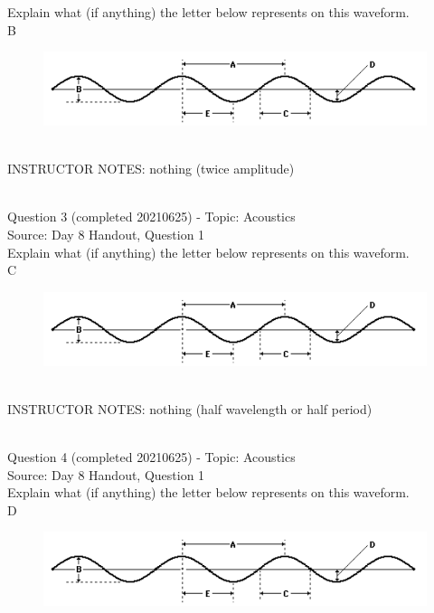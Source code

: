 \documentclass[12pt]{article}
\begin{document}
Explain what (if anything) the letter below represents on this waveform.\\

B

\begin{figure}[H]
\includegraphics{../images/sinusoid.png}
\end{figure}

~\\
INSTRUCTOR NOTES: nothing (twice amplitude)


~\\

{\large Question 3} (completed 20210625) - Topic: Acoustics\\
Source: Day 8 Handout, Question 1\\

Explain what (if anything) the letter below represents on this waveform.\\

C

\begin{figure}[H]
\includegraphics{../images/sinusoid.png}
\end{figure}

~\\
INSTRUCTOR NOTES: nothing (half wavelength or half period)


~\\

{\large Question 4} (completed 20210625) - Topic: Acoustics\\
Source: Day 8 Handout, Question 1\\

Explain what (if anything) the letter below represents on this waveform.\\

D

\begin{figure}[H]
\includegraphics{../images/sinusoid.png}
\end{figure}
\end{document}
